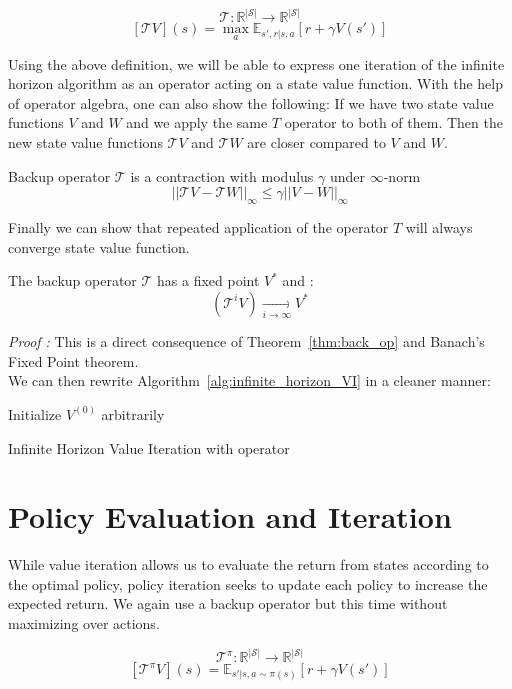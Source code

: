 \documentclass{article}
\begin{document}
\begin{defn}
\[
\mathcal{T} : \mathbb{R}^{|\mathcal{S}|}\rightarrow\mathbb{R}^{|\mathcal{S}|}
\]
\[
[\mathcal{T}V](s) = \max_{a}\mathbb{E}_{s',r|s,a}[r + \gamma V(s')]
\]
\end{defn}
Using the above definition, we will be able to express one iteration of the infinite horizon algorithm as an operator acting on a state value function. With the help of operator algebra, one can also show the following: If we have two state value functions $V$ and $W$ and we apply the same $T$ operator to both of them. Then the new state value functions $\mathcal{T}V$ and $\mathcal{T}W$ are closer compared to $V$ and $W$. 
\begin{thm}
Backup operator $\mathcal{T}$ is a contraction with modulus $\gamma$ under $\infty$-norm
\[
||\mathcal{T}V-\mathcal{T}W||_{\infty}\leq \gamma||V-W||_\infty
\]
\label{thm:back_op}
\end{thm}
Finally we can show that repeated application of the operator $T$ will always converge state value function.  
\begin{thm}
The backup operator $\mathcal{T}$ has a fixed point $V^{*}$ and :
\[
(\mathcal{T}^{i}V)\underset{i\rightarrow\infty}{\rightarrow} V^{*}
\]
\end{thm}
\textit{Proof :} This is a direct consequence of Theorem~\ref{thm:back_op} and Banach's Fixed Point theorem.\\

We can then rewrite Algorithm~\ref{alg:infinite_horizon_VI} in a cleaner manner:
\begin{algorithm}[H]
Initialize $V^{(0)}$ arbitrarily$\;$

\SetAlgoLined
 \caption{Infinite Horizon Value Iteration with operator}
 \label{alg:finite_horizon_VI_op}
\end{algorithm}

\section{Policy Evaluation and Iteration}
While value iteration allows us to evaluate the return from states according to the optimal policy, policy iteration seeks to update each policy to increase the expected return. We again use a backup operator but this time without maximizing over actions. \\

\begin{defn}
\[
\mathcal{T}^{\pi} : \mathbb{R}^{|\mathcal{S}|}\rightarrow\mathbb{R}^{|\mathcal{S}|}
\]
\[
[\mathcal{T}^{\pi}V](s) = \mathbb{E}_{s'|s, a\sim\pi(s)}[r+\gamma V(s')]
\]
\end{defn}
\end{document}
